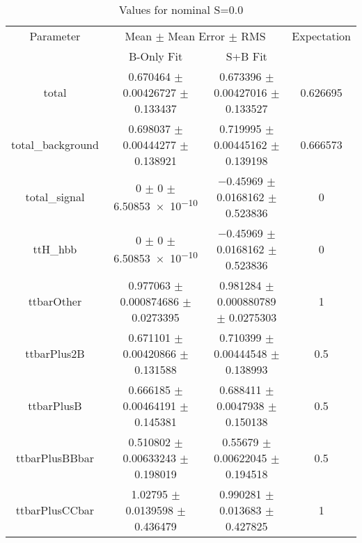 \begin{table}
\centering
\caption{Values for nominal S=0.0}
\begin{tabular}{cccc}
\toprule
Parameter & \multicolumn{2}{c}{Mean $\pm$ Mean Error $\pm$ RMS} & Expectation\\
 & B-Only Fit & S+B Fit & \\
\midrule
total & \num{0.670464} $\pm$ \num{0.00426727} $\pm$ \num{0.133437} & \num{0.673396} $\pm$ \num{0.00427016} $\pm$ \num{0.133527} & \num{0.626695}\\
total\_background & \num{0.698037} $\pm$ \num{0.00444277} $\pm$ \num{0.138921} & \num{0.719995} $\pm$ \num{0.00445162} $\pm$ \num{0.139198} & \num{0.666573}\\
total\_signal & \num{0} $\pm$ \num{0} $\pm$ \num{6.50853e-10} & \num{-0.45969} $\pm$ \num{0.0168162} $\pm$ \num{0.523836} & \num{0}\\
ttH\_hbb & \num{0} $\pm$ \num{0} $\pm$ \num{6.50853e-10} & \num{-0.45969} $\pm$ \num{0.0168162} $\pm$ \num{0.523836} & \num{0}\\
ttbarOther & \num{0.977063} $\pm$ \num{0.000874686} $\pm$ \num{0.0273395} & \num{0.981284} $\pm$ \num{0.000880789} $\pm$ \num{0.0275303} & \num{1}\\
ttbarPlus2B & \num{0.671101} $\pm$ \num{0.00420866} $\pm$ \num{0.131588} & \num{0.710399} $\pm$ \num{0.00444548} $\pm$ \num{0.138993} & \num{0.5}\\
ttbarPlusB & \num{0.666185} $\pm$ \num{0.00464191} $\pm$ \num{0.145381} & \num{0.688411} $\pm$ \num{0.0047938} $\pm$ \num{0.150138} & \num{0.5}\\
ttbarPlusBBbar & \num{0.510802} $\pm$ \num{0.00633243} $\pm$ \num{0.198019} & \num{0.55679} $\pm$ \num{0.00622045} $\pm$ \num{0.194518} & \num{0.5}\\
ttbarPlusCCbar & \num{1.02795} $\pm$ \num{0.0139598} $\pm$ \num{0.436479} & \num{0.990281} $\pm$ \num{0.013683} $\pm$ \num{0.427825} & \num{1}\\
\bottomrule
\end{tabular}
\end{table}